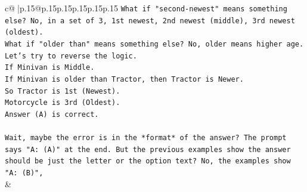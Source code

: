\documentclass{article}
\begin{document}
{\begin{supertabular}{c@{$\;$}|p{.15\linewidth}@{}p{.15\linewidth}p{.15\linewidth}p{.15\linewidth}p{.15\linewidth}p{.15\linewidth}}
{{{\texttt{What if "second{-}newest" means something else? No, in a set of 3, 1st newest, 2nd newest (middle), 3rd newest (oldest).} \\
\texttt{What if "older than" means something else? No, older means higher age.} \\
\texttt{Let's try to reverse the logic.} \\
\texttt{If Minivan is Middle.} \\
\texttt{If Minivan is older than Tractor, then Tractor is Newer.} \\
\texttt{So Tractor is 1st (Newest).} \\
\texttt{Motorcycle is 3rd (Oldest).} \\
\texttt{Answer (A) is correct.} \\
\\ 
\texttt{Wait, maybe the error is in the *format* of the answer? The prompt says "A: (A)" at the end. But the previous examples show the answer should be just the letter or the option text? No, the examples show "A: (B)",} \\
            }
        }
    }
    & \\ \\

\end{supertabular}
}
\end{document}

